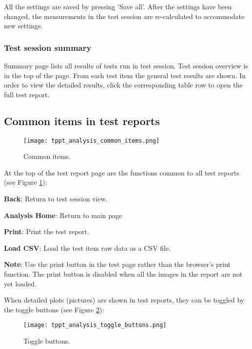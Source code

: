 All the settings are saved by pressing 'Save all'. After the settings have been changed, the measurements in the test session are re-calculated to accommodate new settings.

\subsubsection{Test session summary}

Summary page lists all results of tests run in test session. Test session overview is in the top of the page. From each test item the general test results are shown. In order to view the detailed results, click the corresponding table row to open the full test report.


\subsection{\label{sec:tppt_analysis_test_analysis}Common items in test reports}

\begin{figure}[!h]
	\centering
	\texttt{[image: tppt\_analysis\_common\_items.png]}
	\caption{Common items.}
	\label{fig:tppt_analysis_common_items}
\end{figure}

At the top of the test report page are the functions common to all test reports (see Figure \ref{fig:tppt_analysis_common_items}):

\textbf{Back}: Return to test session view.

\textbf{Analysis Home}: Return to main page

\textbf{Print}: Print the test report. 

\textbf{Load CSV}: Load the test item raw data as a CSV file.

\textbf{Note}: Use the print button in the test page rather than the browser’s print function. The print button is disabled when all the images in the report are not yet loaded.

When detailed plots (pictures) are shown in test reports, they can be toggled by the toggle buttons (see Figure \ref{fig:tppt_analysis_toggle_buttons}):

\begin{figure}[!h]
	\centering
	\texttt{[image: tppt\_analysis\_toggle\_buttons.png]}
	\caption{Toggle buttons.}
	\label{fig:tppt_analysis_toggle_buttons}
\end{figure}

